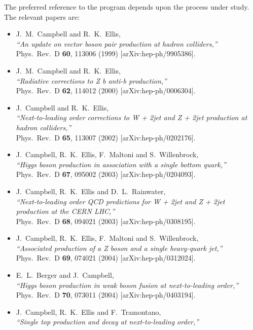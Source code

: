 \documentclass[12pt]{article}
\begin{document}
The preferred reference to the program depends upon the process under study. The relevant papers are:
\begin{itemize}
\item J.~M.~Campbell and R.~K.~Ellis, \\
  {\it ``An update on vector boson pair production at hadron colliders,''} \\
  Phys.\ Rev.\ D {\bf 60}, 113006 (1999)
  [arXiv:hep-ph/9905386].
\item J.~M.~Campbell and R.~K.~Ellis, \\
  {\it ``Radiative corrections to Z b anti-b production,''} \\
  Phys.\ Rev.\ D {\bf 62}, 114012 (2000)
  [arXiv:hep-ph/0006304].
\item J.~Campbell and R.~K.~Ellis, \\
  {\it ``Next-to-leading order corrections to W + 2jet and Z + 2jet production  at
   hadron colliders,''} \\
  Phys.\ Rev.\ D {\bf 65}, 113007 (2002)
  [arXiv:hep-ph/0202176].
\item J.~Campbell, R.~K.~Ellis, F.~Maltoni and S.~Willenbrock, \\
  {\it ``Higgs boson production in association with a single bottom quark,''} \\
  Phys.\ Rev.\ D {\bf 67}, 095002 (2003)
  [arXiv:hep-ph/0204093].
\item J.~Campbell, R.~K.~Ellis and D.~L.~Rainwater, \\
  {\it ``Next-to-leading order QCD predictions for W + 2jet and Z + 2jet  production
     at the CERN LHC,''} \\
  Phys.\ Rev.\ D {\bf 68}, 094021 (2003)
  [arXiv:hep-ph/0308195].
\item J.~Campbell, R.~K.~Ellis, F.~Maltoni and S.~Willenbrock, \\
  {\it ``Associated production of a Z boson and a single heavy-quark jet,''} \\
  Phys.\ Rev.\ D {\bf 69}, 074021 (2004)
  [arXiv:hep-ph/0312024].
\item E.~L.~Berger and J.~Campbell, \\
  {\it ``Higgs boson production in weak boson fusion at next-to-leading order,''} \\
  Phys.\ Rev.\ D {\bf 70}, 073011 (2004)
  [arXiv:hep-ph/0403194].
\item J.~Campbell, R.~K.~Ellis and F.~Tramontano, \\
  {\it ``Single top production and decay at next-to-leading order,''} \\

\end{itemize}
\end{document}
